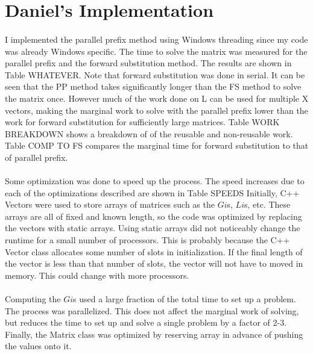 \documentclass[a4paper,12pt]{article}
\begin{document}
\section*{Daniel's Implementation}
	\paragraph*{}
		I implemented the parallel prefix method using Windows threading since my code was already Windows specific.  The time to solve the matrix was measured for the parallel prefix and the forward substitution method.  The results are shown in Table WHATEVER.  Note that forward substitution was done in serial.  It can be seen that the PP method takes significantly longer than the FS method to solve the matrix once.  However much of the work done on L can be used for multiple X vectors, making the marginal work to solve with the parallel prefix lower than the work for forward substitution for sufficiently large matrices.  Table WORK BREAKDOWN shows a breakdown of of the reusable and non-reusable work.  Table COMP TO FS compares the marginal time for forward substitution to that of parallel prefix.  
	\paragraph*{}
		Some optimization was done to speed up the process.  The speed increases due to each of the optimizations described are shown in Table SPEEDS Initially, C++ Vectors were used to store arrays of matrices such as the $Gi$s, $Li$s, etc.  These arrays are all of fixed and known length, so the code was optimized by replacing the vectors with static arrays.  Using static arrays did not noticeably change the runtime for a small number of processors.  This is probably because the C++ Vector class allocates some number of slots in initialization.  If the final length of the vector is less than that number of slots, the vector will not have to moved in memory.  This could change with more processors.  
	\paragraph*{}
		Computing the $Gi$s used a large fraction of the total time to set up a problem.  The process was parallelized.  This does not affect the marginal work of solving, but reduces the time to set up and solve a single problem by a factor of 2-3.  Finally, the Matrix class was optimized by reserving array in advance of pushing the values onto it.  
\end{document}
